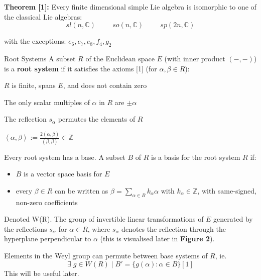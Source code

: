 \documentclass[final]{beamer}
\newlength{\colwidth}
\begin{document}
\begin{frame}[t]
\begin{columns}[t]
\begin{column}{\colwidth}
\textbf{Theorem [1]:} Every finite dimensional simple Lie algebra is isomorphic to one of the classical Lie algebras:
$$
sl(n,\mathbb{C})  \hspace{1cm} so(n,\mathbb{C})  \hspace{1cm}  sp(2n,\mathbb{C})
$$

with the exceptions: $e_{6},e_{7},e_{8},f_{4},g_{2}$

\begin{block}{Root Systems}
A subset $R$ of the Euclidean space $E$ (with inner product $(-,-)$) is a \textbf{root system} if it satisfies the axioms [1] (for $\alpha,\beta \in R$):

\begin{boxlabelR}
    \item $R$ is finite, spans $E$, and does not contain zero
    \item The only scalar multiples of $\alpha$ in $R$ are $\pm \alpha$
    \item The reflection $s_{\alpha}$ permutes the elements of $R$
    \item $\left\langle \alpha,\beta \right\rangle := \frac{2(\alpha,\beta)}{(\beta,\beta)} \in \mathbb{Z}$
\end{boxlabelR}

Every root system has a base. A subset $B$ of $R$ is a basis for the root system $R$ if:
\begin{itemize}
    \item $B$ is a vector space basis for $E$
    \item every $\beta \in R$ can be written as $\beta =\sum_{\alpha \in B}^{}k_{\alpha}\alpha$ with $k_{\alpha} \in \mathbb{Z}$, with same-signed, non-zero coefficients
\end{itemize}

Denoted W(R). The group of invertible linear transformations of $E$ generated by the reflections $s_{\alpha}$ for $\alpha \in R$, where $s_{\alpha}$ denotes the reflection through the hyperplane perpendicular to $\alpha$ (this is visualised later in \textbf{Figure 2}).

Elements in the Weyl group can permute between base systems of $R$, ie.
\begin{equation}
\exists\; g \in W(R)\; |\; B'=\{g(\alpha): \alpha \in B\} [1]\tag{*}
\end{equation}
This will be useful later.
\end{block}


\end{column}
\end{columns}
\end{frame}
\end{document}
